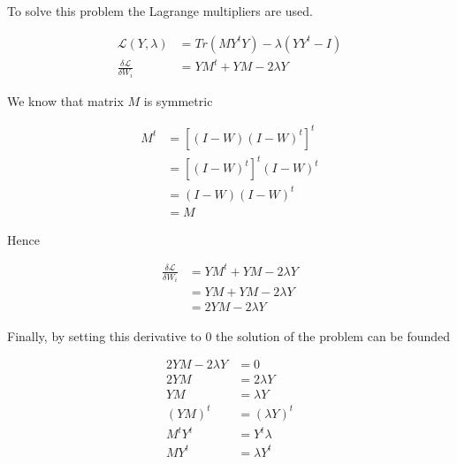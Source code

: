 \documentclass[12pt,journal]{IEEEtran}
\begin{document}
    To solve this problem the Lagrange multipliers are used.

    \begin{equation*}
        \begin{aligned}
            \mathcal{L}(Y, \lambda) &= Tr( M Y^t Y) - \lambda (Y Y^t - I)\\
            \frac{\delta \mathcal{L}}{\delta W_i} &= Y M^t + Y M - 2 \lambda Y
        \end{aligned}
    \end{equation*}

    We know that matrix $M$ is symmetric

    \begin{equation*}
        \begin{aligned}
            M^t &= [(I-W) (I-W)^t]^t\\
                &= [(I-W)^t]^t (I-W)^t\\
                &= (I-W) (I-W)^t\\
                &= M
        \end{aligned}
    \end{equation*}

    Hence

    \begin{equation*}
        \begin{aligned}
            \frac{\delta \mathcal{L}}{\delta W_i} &= Y M^t + Y M - 2 \lambda Y\\
                                                  &= Y M + Y M - 2 \lambda Y\\
                                                  &= 2 Y M - 2 \lambda Y
        \end{aligned}
    \end{equation*}

    Finally, by setting this derivative to 0 the solution of the problem can
    be founded

    \begin{equation*}
        \begin{aligned}
            2 Y M - 2 \lambda Y &= 0 \\
                          2 Y M &= 2 \lambda Y \\
                            Y M &= \lambda Y \\
                            (Y M)^t &= (\lambda Y)^t \\
                            M^t Y^t &= Y^t \lambda \\
                            M Y^t &= \lambda Y^t \\
        \end{aligned}
    \end{equation*}
\end{document}
